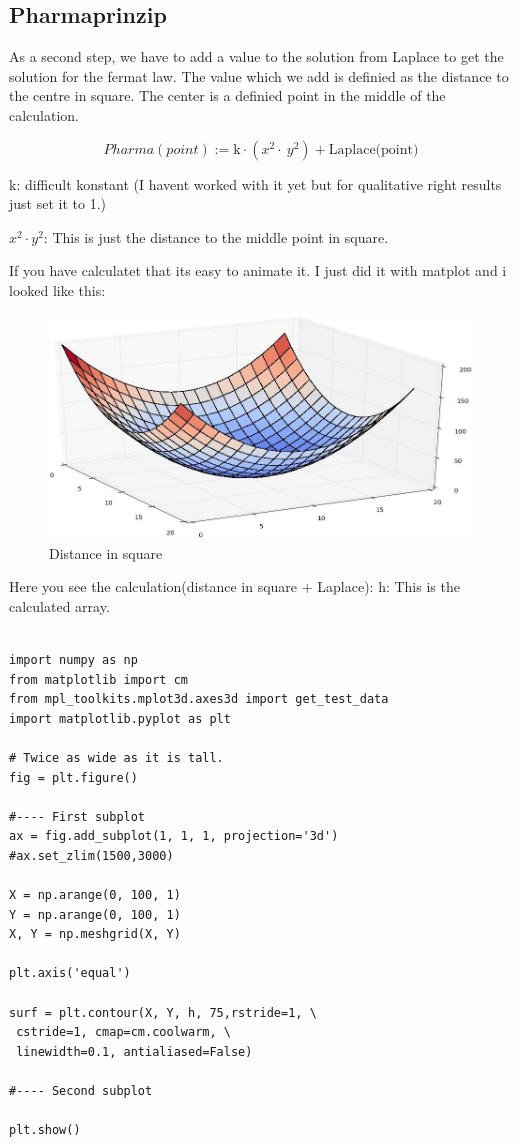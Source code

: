 \documentclass[pdftex,12pt,a4paper]{article}
\begin{document}
\subsection{Pharmaprinzip}

As a second step, we have to add a value to the solution from Laplace to get the solution for the fermat law.
The value which we add is definied as the distance to the centre in square. The center is a definied point in the middle of the calculation.

\[                                                            
	Pharma(point):= \text{k}\cdot\left(x^2\cdot\ y^2\right) + \text{Laplace(point)}
\]

k: difficult konstant (I havent worked with it yet but for qualitative right results just set it to 1.)

\(x^2 \cdot y^2 \): This is just the distance to the middle point in square.

If you have calculatet that its easy to animate it. I just did it with matplot and i looked like this:

\begin{figure}[position=h]
\centering
 \caption{Distance in square}
 \includegraphics[width=12cm]{Bilder/xxyy}%
\end{figure}

\newpage

Here you see the calculation(distance in square + Laplace):
h: This is the calculated array.
\begin{lstlisting}

import numpy as np
from matplotlib import cm
from mpl_toolkits.mplot3d.axes3d import get_test_data
import matplotlib.pyplot as plt

# Twice as wide as it is tall.
fig = plt.figure()

#---- First subplot
ax = fig.add_subplot(1, 1, 1, projection='3d')
#ax.set_zlim(1500,3000)

X = np.arange(0, 100, 1)
Y = np.arange(0, 100, 1)
X, Y = np.meshgrid(X, Y)

plt.axis('equal')

surf = plt.contour(X, Y, h, 75,rstride=1, \
 cstride=1, cmap=cm.coolwarm, \
 linewidth=0.1, antialiased=False)

#---- Second subplot

plt.show()

\end{lstlisting}
\end{document}
